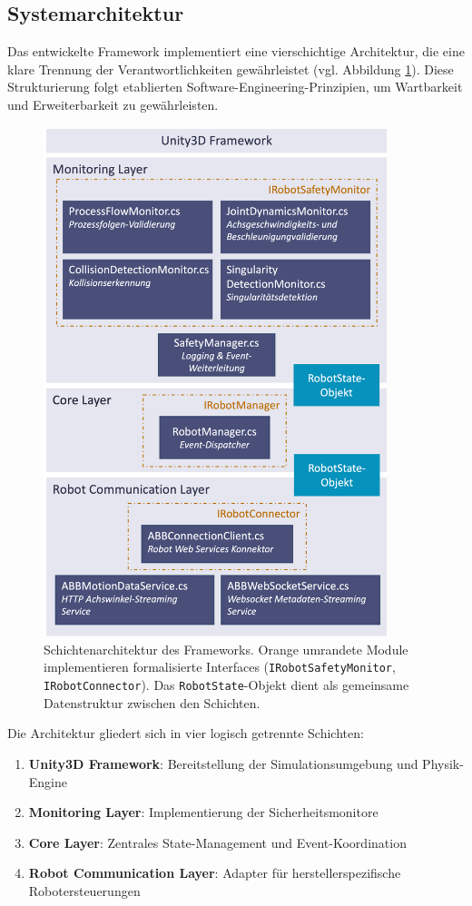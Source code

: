 \subsection{Systemarchitektur}

Das entwickelte Framework implementiert eine vierschichtige Architektur, die
eine klare Trennung der Verantwortlichkeiten gewährleistet (vgl. Abbildung
\ref{fig:layer_architecture}). Diese Strukturierung folgt etablierten
Software-Engineering-Prinzipien, um Wartbarkeit und Erweiterbarkeit zu
gewährleisten.

\begin{figure}[H]
  \centering
  \includegraphics[width=10cm]{figures/LayerArchitekturFramework.png}
  \caption{Schichtenarchitektur des Frameworks. Orange umrandete
    Module implementieren formalisierte Interfaces
    (\texttt{IRobotSafetyMonitor}, \texttt{IRobotConnector}). Das
    \texttt{RobotState}-Objekt dient als gemeinsame Datenstruktur
  zwischen den Schichten.}
  \label{fig:layer_architecture}
\end{figure}

Die Architektur gliedert sich in vier logisch getrennte Schichten:

\begin{enumerate}
  \item \textbf{Unity3D Framework}: Bereitstellung der
    Simulationsumgebung und Physik-Engine
  \item \textbf{Monitoring Layer}: Implementierung der Sicherheitsmonitore
  \item \textbf{Core Layer}: Zentrales State-Management und Event-Koordination
  \item \textbf{Robot Communication Layer}: Adapter für
    herstellerspezifische Robotersteuerungen
\end{enumerate}

